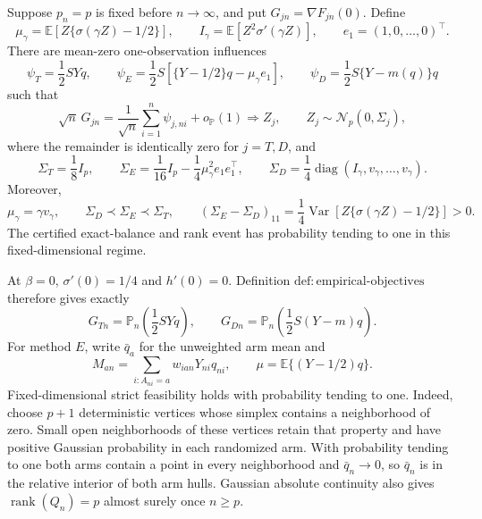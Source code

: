 Suppose \(p_n=p\) is fixed before \(n\to\infty\), and put \(G_{jn}=\nabla F_{jn}(0)\).  Define
\[
 \mu_\gamma=\mathbb E\!\left[Z\{\sigma(\gamma Z)-1/2\}\right],
 \qquad
 I_\gamma=\mathbb E[Z^2\sigma'(\gamma Z)],
 \qquad e_1=(1,0,\ldots,0)^\top.
\]
There are mean-zero one-observation influences
\[
 \psi_T=\frac12SYq,
 \qquad
 \psi_E=\frac12S\left[\{Y-1/2\}q-\mu_\gamma e_1\right],
 \qquad
 \psi_D=\frac12S\{Y-m(q)\}q
\]
such that
\[
 \sqrt n\,G_{jn}=\frac1{\sqrt n}\sum_{i=1}^n\psi_{j,ni}+o_{\mathbb P}(1)
 \Rightarrow Z_j,
 \qquad Z_j\sim\mathcal N_p(0,\Sigma_j),
\]
where the remainder is identically zero for \(j=T,D\), and
\[
 \Sigma_T=\frac18I_p,
 \qquad
 \Sigma_E=\frac1{16}I_p-\frac14\mu_\gamma^2e_1e_1^\top,
 \qquad
 \Sigma_D=\frac14\operatorname{diag}(I_\gamma,v_\gamma,\ldots,v_\gamma).
\]
Moreover,
\[
 \mu_\gamma=\gamma v_\gamma,
 \qquad
 \Sigma_D\prec\Sigma_E\prec\Sigma_T,
 \qquad
 (\Sigma_E-\Sigma_D)_{11}
 =\frac14\operatorname{Var}\!\left[Z\{\sigma(\gamma Z)-1/2\}\right]>0.
\]
The certified exact-balance and rank event has probability tending to one in this fixed-dimensional regime.

At \(\beta=0\), \(\sigma'(0)=1/4\) and \(h'(0)=0\).  Definition \(\mathrm{def{:}empirical\mbox{-}objectives}\) therefore gives exactly
\[
 G_{Tn}=\mathbb P_n\!\left(\frac12SYq\right),
 \qquad
 G_{Dn}=\mathbb P_n\!\left(\frac12S(Y-m)q\right).
 \tag{1}
\]
For method \(E\), write \(\bar q_a\) for the unweighted arm mean and
\[
 M_{an}=\sum_{i:A_{ni}=a}w_{ian}Y_{ni}q_{ni},
 \qquad \mu=\mathbb E\{(Y-1/2)q\}.
\]
Fixed-dimensional strict feasibility holds with probability tending to one.  Indeed, choose \(p+1\) deterministic vertices whose simplex contains a neighborhood of zero.  Small open neighborhoods of these vertices retain that property and have positive Gaussian probability in each randomized arm.  With probability tending to one both arms contain a point in every neighborhood and \(\bar q_n\to0\), so \(\bar q_n\) is in the relative interior of both arm hulls.  Gaussian absolute continuity also gives \(\operatorname{rank}(Q_n)=p\) almost surely once \(n\ge p\).

